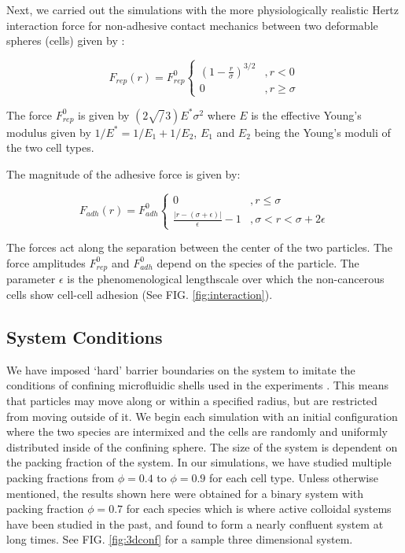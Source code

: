 \documentclass[aps,prb,twocolumn,groupedaddress,nofootinbib,floatfix]{revtex4}
\begin{document}
Next, we carried out the simulations with the more physiologically realistic Hertz interaction force for non-adhesive contact mechanics between two deformable spheres (cells) given by \cite{}:

\begin{equation}
  F_{rep}(r) = F^0_{rep} \left\{ 
    \begin{array}{lr}
      (1-\frac{r}{\sigma})^{3/2} &, r < 0\\
      0 &, r \ge \sigma
    \end{array}
  \right.
  \label{eq:frep}
\end{equation}

The force $F^0_{rep}$ is given by $(2 \sqrt/3) E^* \sigma^2$ where $E$ is the effective Young's modulus given by $1/E^*=1/E_1 + 1/E_2$, $E_1$ and $E_2$ being the Young's moduli of the two cell types. 


The magnitude of the adhesive force is given by:

\begin{equation}
  F_{adh}(r) =F^0_{adh} \left\{
    \begin{array}{lr}
      0 &, r \le \sigma \\
      \frac{|r - (\sigma+\epsilon)|}{\epsilon}-1 &, \sigma < r < \sigma+2\epsilon
    \end{array}
  \right.
  \label{eq:fadh}
\end{equation}

The forces act along the separation between the center of the two particles. The force amplitudes  $F^0_{rep}$ and $F^0_{adh}$ depend on the species of the particle.  The parameter $\epsilon$ is the phenomenological lengthscale over which the non-cancerous cells show cell-cell adhesion (See FIG. \ref{fig:interaction}). 



\subsection{System Conditions}
We have imposed `hard' barrier boundaries on the system to imitate the conditions of confining microfluidic shells used in the experiments \cite{Mingming}. 
This means that particles may move along or within a specified radius, but are restricted from moving outside of it. We begin each simulation with an initial configuration 
where the two species are intermixed and the cells are randomly and uniformly distributed inside of the confining sphere. The size of the system is dependent on the 
packing fraction of the system. In our simulations, we have studied multiple packing fractions from $\phi=0.4$ to $\phi=0.9$ for each cell type. Unless otherwise mentioned, the results shown here were obtained
for a binary system with packing fraction $\phi=0.7$ for each species which is where active colloidal systems have been studied in the past\cite{RednerBaskaran}, and found to form a nearly confluent system at long times. 
See FIG. \ref{fig:3dconf} for a sample three dimensional system.
\end{document}
